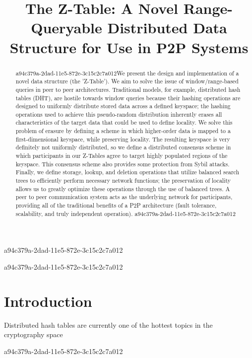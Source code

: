 \documentclass[12pt]{article}
\title{The Z-Table: A Novel Range-Queryable Distributed Data Structure for Use in P2P Systems}
\begin{document}
a94c379a-2dad-11e5-872e-3c15c2c7a012\maketitle

\begin{abstract}
a94c379a-2dad-11e5-872e-3c15c2c7a012We present the design and implementation of a novel data structure (the 'Z-Table'). We aim to solve the issue of window/range-based queries in peer to peer architectures. Traditional models, for example,  distributed hash tables (DHT), are hostile towards window queries because their hashing operations are designed to uniformly distribute stored data across a defined keyspace; the hashing operations used to achieve this pseudo-random distribution inherently erases all characteristics of the target data that could be used to define locality. We solve this problem of erasure by defining a scheme in which higher-order data is mapped to a first-dimensional keyspace, while preserving locality. The resulting keyspace is very definitely not uniformly distributed, so we define a distributed consensus scheme in which participants in our Z-Tables agree to target highly populated regions of the keyspace. This consensus scheme also provides some protection from Sybil attacks. Finally, we define storage, lookup, and deletion operations that utilize balanced search trees to efficiently perform necessary network functions; the preservation of locality allows us to greatly optimize these operations through the use of balanced trees. A peer to peer communication system acts as the underlying network for participants, providing all of the traditional benefits of a P2P architecture (fault tolerance, scalability, and truly independent operation).
a94c379a-2dad-11e5-872e-3c15c2c7a012\end{abstract}

a94c379a-2dad-11e5-872e-3c15c2c7a012
\newpage
\section{Introduction}
Distributed hash tables are currently one of the hottest topics in the cryptography space~\cite{Stoica:2001dj,Rowstron:2001ea,Ratnasamy:2001wn}

\printbibliography
a94c379a-2dad-11e5-872e-3c15c2c7a012
\end{document}

